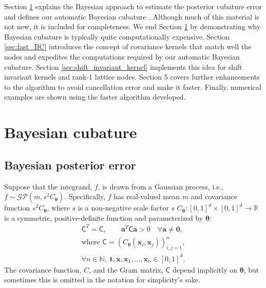 \documentclass[twocolumn]{svjour3}          %
\newcommand{\bm}[1]{\boldsymbol{#1}}
\newcommand{\vtheta}{{\bm{\theta}}}
\newcommand{\va}{\bm{a}}
\newcommand{\vt}{\bm{t}}
\newcommand{\vx}{\bm{x}}
\newcommand{\vzero}{\bm{0}}
\newcommand{\mC}{\mathsf{C}}
\begin{document}
Section \ref{sec:BC} explains the Bayesian approach to estimate the posterior cubature error and defines our automatic Bayesian cubature . Although much of this material is not new, it is included for completeness.  We end Section \ref{sec:BC}  by demonstrating why Bayesian cubature is typically quite computationally expensive.
Section \ref{sec:fast_BC}  introduces the concept of covariance kernels that match well the nodes and expedites the computations required by our automatic Bayesian cubature. 
Section \ref{sec:shift_invariant_kernel} implements this idea for shift invariant kernels and rank-1 lattice nodes.
Section 5 covers further enhancements to the algorithm to avoid cancellation error and make it faster. Finally, numerical examples are shown using the faster algorithm developed.



\section{Bayesian cubature} \label{sec:BC}
\label{sec:1}

\subsection{Bayesian posterior error}
\label{sec:BayesPostErr}

Suppose that the integrand, $f$, is drawn from a Gaussian process, i.e., $f \sim \mathcal{GP}(m,s^2 C_\vtheta)$.  Specifically, $f$ has real-valued mean $m$ and covariance function $s^2C_\vtheta$, where $s$ is a non-negative scale factor $s$ $C_\vtheta: [0,1]^d \times [0,1]^d \to \mathbb{R} $ is a symmetric, positive-definite function and parameterized by $\vtheta$:
\begin{multline} \label{FJH:eq:CondPosDef}
\mC^T = \mC,  \qquad \va^T \mC \va > 0 \quad  \forall \va \ne \vzero, 
\\ \text{where } \mC = \left(  C_\vtheta(\vx_i,\vx_j)  \right)_{i,j=1}^n,\\
\forall n\in \mathbb{N}, \; \vt, \vx, \vx_1, \ldots, \vx_n \in [0,1]^d.
\end{multline}
The covariance function, $C$, and the Gram matrix, $\mC$ depend implicitly on $\vtheta$, but sometimes this is omitted in the notation for simplicity's sake.
\end{document}
